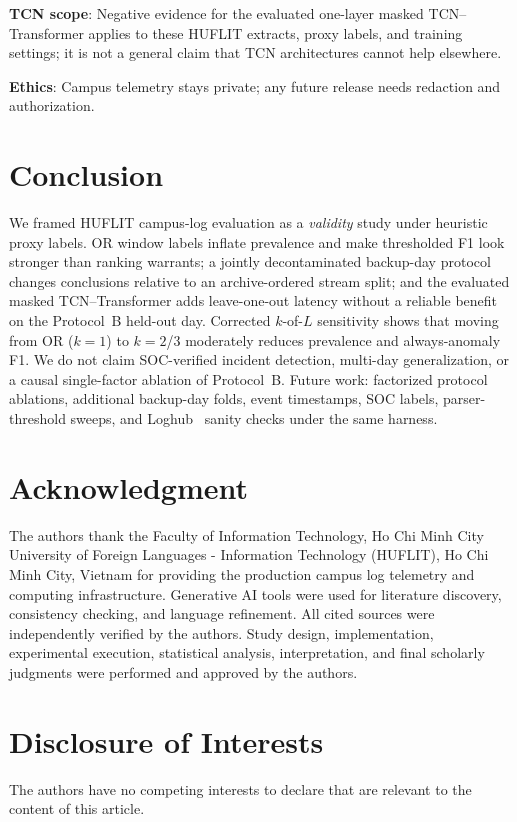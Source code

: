 \documentclass[a4paper]{llncs}
\begin{document}
\textbf{TCN scope}: Negative evidence for the evaluated one-layer masked TCN--Transformer applies to these HUFLIT extracts, proxy labels, and training settings; it is not a general claim that TCN architectures cannot help elsewhere.

\textbf{Ethics}: Campus telemetry stays private; any future release needs redaction and authorization.

\section{Conclusion}
We framed HUFLIT campus-log evaluation as a \emph{validity} study under heuristic proxy labels. OR window labels inflate prevalence and make thresholded F1 look stronger than ranking warrants; a jointly decontaminated backup-day protocol changes conclusions relative to an archive-ordered stream split; and the evaluated masked TCN--Transformer adds leave-one-out latency without a reliable benefit on the Protocol~B held-out day. Corrected $k$-of-$L$ sensitivity shows that moving from OR ($k{=}1$) to $k{=}2$/$3$ moderately reduces prevalence and always-anomaly F1. We do not claim SOC-verified incident detection, multi-day generalization, or a causal single-factor ablation of Protocol~B. Future work: factorized protocol ablations, additional backup-day folds, event timestamps, SOC labels, parser-threshold sweeps, and Loghub~\cite{ref_loghub} sanity checks under the same harness.

\section*{Acknowledgment}
The authors thank the Faculty of Information Technology, Ho Chi Minh City University of Foreign Languages - Information Technology (HUFLIT), Ho Chi Minh City, Vietnam for providing the production campus log telemetry and computing infrastructure. Generative AI tools were used for literature discovery, consistency checking, and language refinement. All cited sources were independently verified by the authors. Study design, implementation, experimental execution, statistical analysis, interpretation, and final scholarly judgments were performed and approved by the authors.

\section*{Disclosure of Interests}
The authors have no competing interests to declare that are relevant to the content of this article.
\end{document}
